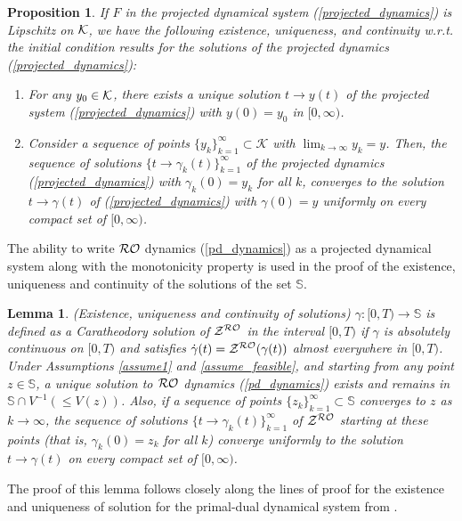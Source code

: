 \documentclass[journal,twoside,web]{ieeecolor}
\newtheorem{lemma}{Lemma}
\newtheorem{proposition}[theorem]{Proposition}
\begin{document}
\begin{proposition} \label{proposition_projected}
If $F$ in the projected dynamical system (\ref{projected_dynamics}) is Lipschitz on ${\cal K}$, we have the following existence, uniqueness, and continuity w.r.t. the initial condition results for the solutions of the projected dynamics (\ref{projected_dynamics}):
\begin{enumerate}
\item For any $y_{0} \in {\cal K}$, there exists a unique solution $t \rightarrow y(t)$ of the projected system (\ref{projected_dynamics}) with $y(0)=y_{0}$ in $[0,\infty)$.
\item Consider a sequence of points $\{y_{k}\}_{k=1}^\infty \subset {\mathcal K}$ with $\lim_{k \rightarrow \infty} y_k=y$. Then, the sequence of solutions $\{t \rightarrow \gamma_k(t)\}_{k=1}^\infty$ of the projected dynamics (\ref{projected_dynamics}) with $\gamma_k(0)=y_k$ for all $k$, converges to the solution $t \rightarrow \gamma(t)$ of (\ref{projected_dynamics}) with $\gamma(0)=y$ uniformly on every compact set of $[0,\infty)$.
\end{enumerate}
\end{proposition}
The ability to write ${\cal RO}$ dynamics (\ref{pd_dynamics}) as a projected dynamical system along with the monotonicity property is used in the proof of the existence, uniqueness and continuity of the solutions of the set ${\mathbb S}$.

\begin{lemma} \label{uniq_exis}
(Existence, uniqueness and continuity of solutions)
$\gamma:[0,T) \rightarrow {\mathbb S}$ is defined as a Caratheodory solution of ${\cal Z}^{\cal RO}$ in the interval $[0,T)$ if $\gamma$ is absolutely continuous on $[0,T)$ and satisfies $\dot \gamma(t)={\cal Z}^{\cal RO} (\gamma(t))$ almost everywhere in $[0,T)$.
Under Assumptions \ref{assume1} and \ref{assume_feasible}, and starting from any point $z\in \mathbb S$, a unique solution to ${\cal RO}$ dynamics (\ref{pd_dynamics}) exists and remains in $\mathbb S \cap V^{-1}(\leq V(z))$. Also, if a sequence of points $\{z_k\}_{k=1}^\infty \subset {\mathbb S}$ converges to $z$ as $k \rightarrow \infty$, the sequence of solutions $\{t \rightarrow \gamma_k(t)\}_{k=1}^\infty$ of ${\cal Z}^{\cal RO}$ starting at these points (that is, $\gamma_k(0)=z_k$ for all $k$) converge uniformly to the solution $t \rightarrow \gamma(t)$ on every compact set of $[0,\infty)$.
\end{lemma}
The proof of this lemma follows closely along the lines of proof for the existence and uniqueness of solution for the primal-dual dynamical system from \cite[Lemma~4.3]{cherukuri2016}.
\end{document}
